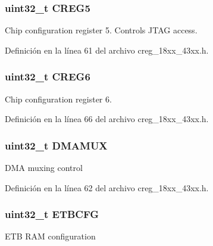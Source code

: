 \subsubsection[{\texorpdfstring{C\+R\+E\+G5}{CREG5}}]{ uint32\+\_\+t C\+R\+E\+G5}\hypertarget{struct_l_p_c___c_r_e_g___t_a3f736a3ef782cd8e8ad6d03e5e1bc50d}{}\label{struct_l_p_c___c_r_e_g___t_a3f736a3ef782cd8e8ad6d03e5e1bc50d}
Chip configuration register 5. Controls J\+T\+AG access. 

Definición en la línea 61 del archivo creg\+\_\+18xx\+\_\+43xx.\+h.

\subsubsection[{\texorpdfstring{C\+R\+E\+G6}{CREG6}}]{ uint32\+\_\+t C\+R\+E\+G6}\hypertarget{struct_l_p_c___c_r_e_g___t_a56d17e41f91712971d39fb3dc3300ed5}{}\label{struct_l_p_c___c_r_e_g___t_a56d17e41f91712971d39fb3dc3300ed5}
Chip configuration register 6. 

Definición en la línea 66 del archivo creg\+\_\+18xx\+\_\+43xx.\+h.

\subsubsection[{\texorpdfstring{D\+M\+A\+M\+UX}{DMAMUX}}]{ uint32\+\_\+t D\+M\+A\+M\+UX}\hypertarget{struct_l_p_c___c_r_e_g___t_ad9d143d5be7d4bb45b9ad7d228a3d0b6}{}\label{struct_l_p_c___c_r_e_g___t_ad9d143d5be7d4bb45b9ad7d228a3d0b6}
D\+MA muxing control 

Definición en la línea 62 del archivo creg\+\_\+18xx\+\_\+43xx.\+h.

\subsubsection[{\texorpdfstring{E\+T\+B\+C\+FG}{ETBCFG}}]{ uint32\+\_\+t E\+T\+B\+C\+FG}\hypertarget{struct_l_p_c___c_r_e_g___t_ae1ded34feec5c0e8714eff15c2442732}{}\label{struct_l_p_c___c_r_e_g___t_ae1ded34feec5c0e8714eff15c2442732}
E\+TB R\+AM configuration 

